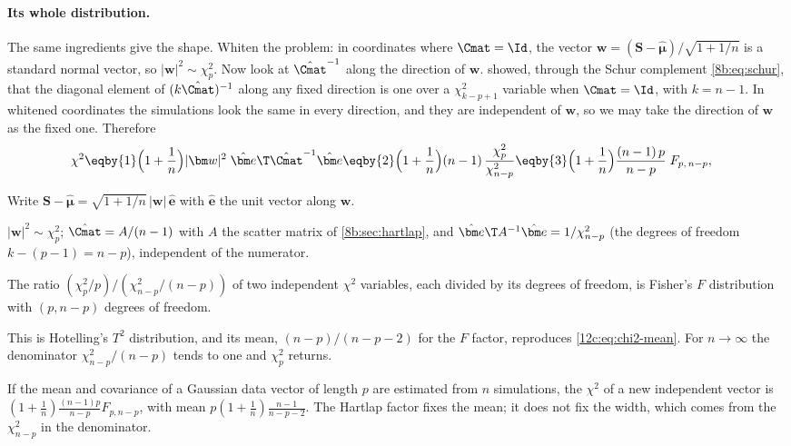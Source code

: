 \paragraph{Its whole distribution.} The same ingredients give the shape. Whiten the problem: in coordinates where
$\Cmat=\Id$, the vector $\bm w=(\bm S-\hat{\bm\mu})/\sqrt{1+1/n}$ is a standard normal vector, so $|\bm w|^2\sim\chi^2_p$.
Now look at $\hat\Cmat^{-1}$ along the direction of $\bm w$.  showed, through the Schur complement
\eqref{8b:eq:schur}, that the diagonal element of $(k\hat\Cmat)^{-1}$ along any fixed direction is one over a
$\chi^2_{k-p+1}$ variable when $\Cmat=\Id$, with $k=n-1$. In whitened coordinates the simulations look the same in every
direction, and they are independent of $\bm w$, so we may take the direction of $\bm w$ as the fixed one. Therefore
\begin{align}
  \chi^2
  &\eqby{1}\Bigl(1+\frac1n\Bigr)|\bm w|^2\;\hat{\bm e}\T\hat\Cmat^{-1}\hat{\bm e}
   \eqby{2}\Bigl(1+\frac1n\Bigr)(n-1)\,\frac{\chi^2_p}{\chi^2_{n-p}}
   \eqby{3}\Bigl(1+\frac1n\Bigr)\frac{(n-1)\,p}{n-p}\;F_{p,\,n-p},
  \label{12c:eq:hotelling}
\end{align}
\begin{explain}
  \item Write $\bm S-\hat{\bm\mu}=\sqrt{1+1/n}\,|\bm w|\,\hat{\bm e}$ with $\hat{\bm e}$ the unit vector along $\bm w$.
  \item $|\bm w|^2\sim\chi^2_p$; $\hat\Cmat=A/(n-1)$ with $A$ the scatter matrix of \cref{8b:sec:hartlap}, and
        $\hat{\bm e}\T A^{-1}\hat{\bm e}=1/\chi^2_{n-p}$ (the degrees of freedom $k-(p-1)=n-p$), independent of the numerator.
  \item The ratio $(\chi^2_p/p)/(\chi^2_{n-p}/(n-p))$ of two independent $\chi^2$ variables, each divided by its degrees of
        freedom, is Fisher's $F$ distribution with $(p,n-p)$ degrees of freedom.
\end{explain}
This is Hotelling's $T^2$ distribution, and its mean, $(n-p)/(n-p-2)$ for the $F$ factor, reproduces
\eqref{12c:eq:chi2-mean}. For $n\to\infty$ the denominator $\chi^2_{n-p}/(n-p)$ tends to one and $\chi^2_p$ returns.

\begin{keyidea}
If the mean and covariance of a Gaussian data vector of length $p$ are estimated from $n$ simulations, the $\chi^2$ of a new
independent vector is $(1+\frac1n)\frac{(n-1)p}{n-p}F_{p,n-p}$, with mean $p(1+\frac1n)\frac{n-1}{n-p-2}$. The Hartlap
factor fixes the mean; it does not fix the width, which comes from the $\chi^2_{n-p}$ in the denominator.
\end{keyidea}

